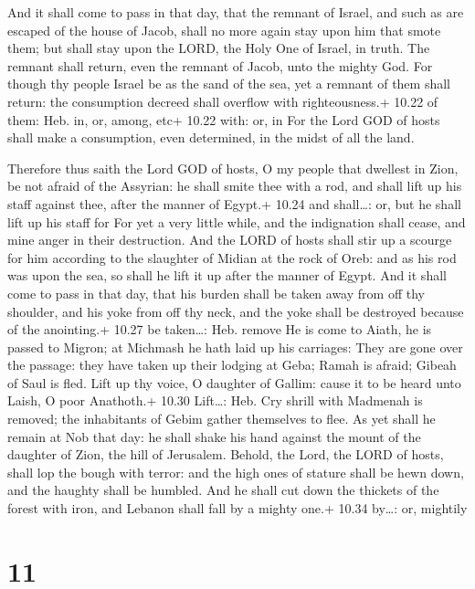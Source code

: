  And it shall come to pass in that day, that the remnant
of Israel, and such as are escaped of the house of Jacob, shall no more
again stay upon him that smote them; but shall stay upon the LORD, the
Holy One of Israel, in truth.  The remnant shall return,
even the remnant of Jacob, unto the mighty God.  For though
thy people Israel be as the sand of the sea, yet a remnant of them shall
return: the consumption decreed shall overflow with righteousness.+
10.22 of them: Heb. in, or, among, etc+ 10.22 with: or, in 
For the Lord GOD of hosts shall make a consumption, even determined, in
the midst of all the land.

 Therefore thus saith the Lord GOD of hosts, O my people
that dwellest in Zion, be not afraid of the Assyrian: he shall smite
thee with a rod, and shall lift up his staff against thee, after the
manner of Egypt.+ 10.24 and shall\ldots: or, but he shall lift up his
staff for  For yet a very little while, and the indignation
shall cease, and mine anger in their destruction.  And the
LORD of hosts shall stir up a scourge for him according to the slaughter
of Midian at the rock of Oreb: and as his rod was upon the sea, so shall
he lift it up after the manner of Egypt.  And it shall come
to pass in that day, that his burden shall be taken away from off thy
shoulder, and his yoke from off thy neck, and the yoke shall be
destroyed because of the anointing.+ 10.27 be taken\ldots: Heb. remove
 He is come to Aiath, he is passed to Migron; at Michmash
he hath laid up his carriages:  They are gone over the
passage: they have taken up their lodging at Geba; Ramah is afraid;
Gibeah of Saul is fled.  Lift up thy voice, O daughter of
Gallim: cause it to be heard unto Laish, O poor Anathoth.+ 10.30
Lift\ldots: Heb. Cry shrill with  Madmenah is removed; the
inhabitants of Gebim gather themselves to flee.  As yet
shall he remain at Nob that day: he shall shake his hand against the
mount of the daughter of Zion, the hill of Jerusalem. 
Behold, the Lord, the LORD of hosts, shall lop the bough with terror:
and the high ones of stature shall be hewn down, and the haughty shall
be humbled.  And he shall cut down the thickets of the
forest with iron, and Lebanon shall fall by a mighty one.+ 10.34
by\ldots: or, mightily

\hypertarget{section-10}{%
\section{11}\label{section-10}}

